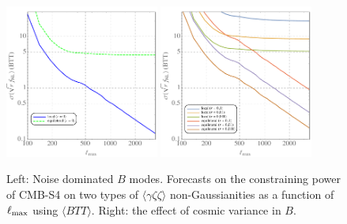 \begin{figure}[htbp!]
\centering
\includegraphics[width=0.45\textwidth]{Inflation/DeltaFNL_BTT_no_r}
\includegraphics[width=0.45\textwidth]{Inflation/DeltaFNL_BTT_with_r}
\caption{Left: Noise dominated $B$ modes. Forecasts on the constraining power of CMB-S4 on two types of $\langle \gamma \zeta \zeta\rangle$ non-Gaussianities as a function of $\ell_{\rm max}$ using $\langle BTT\rangle$. Right: the effect of cosmic variance in $B$.  }
\label{fig_fnlforecastBTT}
\end{figure}




